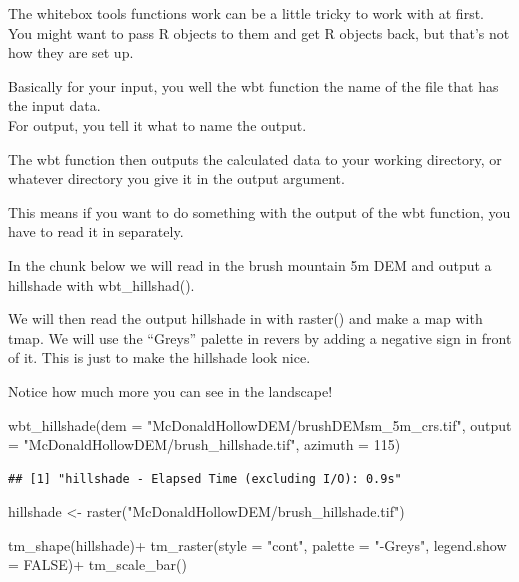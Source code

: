 \documentclass[
]{book}
\newenvironment{Shaded}{\begin{snugshade}}{\end{snugshade}}
\newcommand{\AttributeTok}[1]{\textcolor[rgb]{0.77,0.63,0.00}{#1}}
\newcommand{\ConstantTok}[1]{\textcolor[rgb]{0.00,0.00,0.00}{#1}}
\newcommand{\DecValTok}[1]{\textcolor[rgb]{0.00,0.00,0.81}{#1}}
\newcommand{\FunctionTok}[1]{\textcolor[rgb]{0.00,0.00,0.00}{#1}}
\newcommand{\NormalTok}[1]{#1}
\newcommand{\OtherTok}[1]{\textcolor[rgb]{0.56,0.35,0.01}{#1}}
\newcommand{\SpecialCharTok}[1]{\textcolor[rgb]{0.00,0.00,0.00}{#1}}
\newcommand{\StringTok}[1]{\textcolor[rgb]{0.31,0.60,0.02}{#1}}
\begin{document}
The whitebox tools functions work can be a little tricky to work with at first. You might want to pass R objects to them and get R objects back, but that's not how they are set up.

Basically for your input, you well the wbt function the name of the file that has the input data.\\
For output, you tell it what to name the output.

The wbt function then outputs the calculated data to your working directory, or whatever directory you give it in the output argument.

This means if you want to do something with the output of the wbt function, you have to read it in separately.

In the chunk below we will read in the brush mountain 5m DEM and output a hillshade with wbt\_hillshad().

We will then read the output hillshade in with raster() and make a map with tmap. We will use the ``Greys'' palette in revers by adding a negative sign in front of it. This is just to make the hillshade look nice.

Notice how much more you can see in the landscape!

\begin{Shaded}
\begin{Highlighting}[]
\FunctionTok{wbt\_hillshade}\NormalTok{(}\AttributeTok{dem =} \StringTok{"McDonaldHollowDEM/brushDEMsm\_5m\_crs.tif"}\NormalTok{,}
              \AttributeTok{output =} \StringTok{"McDonaldHollowDEM/brush\_hillshade.tif"}\NormalTok{,}
              \AttributeTok{azimuth =} \DecValTok{115}\NormalTok{)}
\end{Highlighting}
\end{Shaded}

\begin{verbatim}
## [1] "hillshade - Elapsed Time (excluding I/O): 0.9s"
\end{verbatim}

\begin{Shaded}
\begin{Highlighting}[]
\NormalTok{hillshade }\OtherTok{\textless{}{-}} \FunctionTok{raster}\NormalTok{(}\StringTok{"McDonaldHollowDEM/brush\_hillshade.tif"}\NormalTok{)}

\FunctionTok{tm\_shape}\NormalTok{(hillshade)}\SpecialCharTok{+}
  \FunctionTok{tm\_raster}\NormalTok{(}\AttributeTok{style =} \StringTok{"cont"}\NormalTok{, }\AttributeTok{palette =} \StringTok{"{-}Greys"}\NormalTok{, }\AttributeTok{legend.show =} \ConstantTok{FALSE}\NormalTok{)}\SpecialCharTok{+}
  \FunctionTok{tm\_scale\_bar}\NormalTok{()}
\end{Highlighting}
\end{Shaded}
\end{document}
